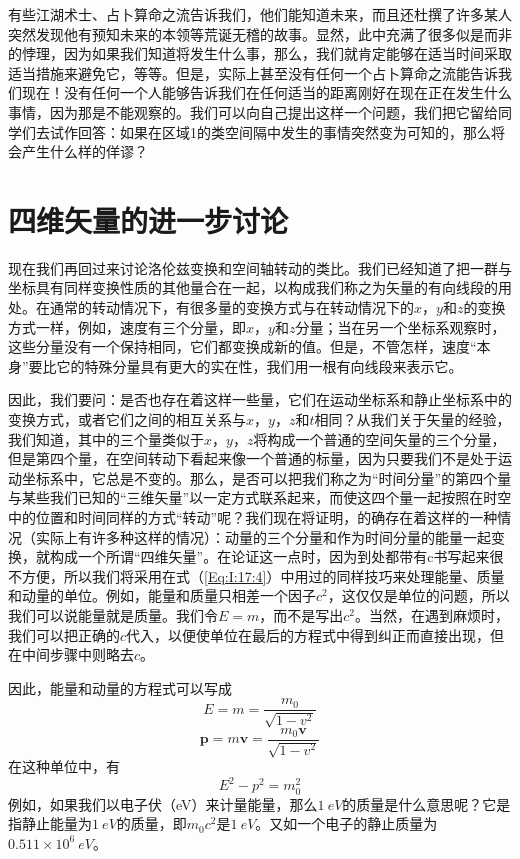 有些江湖术士、占卜算命之流告诉我们，他们能知道未来，而且还杜撰了许多某人突然发现他有预知未来的本领等荒诞无稽的故事。显然，此中充满了很多似是而非的悖理，因为如果我们知道将发生什么事，那么，我们就肯定能够在适当时间采取适当措施来避免它，等等。但是，实际上甚至没有任何一个占卜算命之流能告诉我们现在！没有任何一个人能够告诉我们在任何适当的距离刚好在现在正在发生什么事情，因为那是不能观察的。我们可以向自己提出这样一个问题，我们把它留给同学们去试作回答：如果在区域1的类空间隔中发生的事情突然变为可知的，那么将会产生什么样的佯谬？

\section{四维矢量的进一步讨论}

现在我们再回过来讨论洛伦兹变换和空间轴转动的类比。我们已经知道了把一群与坐标具有同样变换性质的其他量合在一起，以构成我们称之为矢量的有向线段的用处。在通常的转动情况下，有很多量的变换方式与在转动情况下的$x$，$y$和$z$的变换方式一样，例如，速度有三个分量，即$x$，$y$和$z$分量；当在另一个坐标系观察时，这些分量没有一个保持相同，它们都变换成新的值。但是，不管怎样，速度“本身”要比它的特殊分量具有更大的实在性，我们用一根有向线段来表示它。

因此，我们要问：是否也存在着这样一些量，它们在运动坐标系和静止坐标系中的变换方式，或者它们之间的相互关系与$x$，$y$，$z$和$t$相同？从我们关于矢量的经验，我们知道，其中的三个量类似于$x$，$y$，$z$将构成一个普通的空间矢量的三个分量，但是第四个量，在空间转动下看起来像一个普通的标量，因为只要我们不是处于运动坐标系中，它总是不变的。那么，是否可以把我们称之为“时间分量”的第四个量与某些我们已知的“三维矢量”以一定方式联系起来，而使这四个量一起按照在时空中的位置和时间同样的方式“转动”呢？我们现在将证明，的确存在着这样的一种情况（实际上有许多种这样的情况）：动量的三个分量和作为时间分量的能量一起变换，就构成一个所谓“四维矢量”。在论证这一点时，因为到处都带有c书写起来很不方便，所以我们将采用在式（\ref{Eq:I:17:4}）中用过的同样技巧来处理能量、质量和动量的单位。例如，能量和质量只相差一个因子$c^2$，这仅仅是单位的问题，所以我们可以说能量就是质量。我们令$E=m$，而不是写出$c^2$。当然，在遇到麻烦时，我们可以把正确的$c$代入，以便使单位在最后的方程式中得到纠正而直接出现，但在中间步骤中则略去$c$。

因此，能量和动量的方程式可以写成
\begin{equation*}
    E=m=\frac{m_0}{\sqrt{1-v^2}}
\end{equation*}
\begin{equation}
    \label{Eq:I:17:6}
    \boldsymbol{p}=m\boldsymbol{v}=\frac{m_0\boldsymbol{v}}{\sqrt{1-v^2}}
\end{equation}
在这种单位中，有
\begin{equation}
    \label{Eq:I:17:7}
    E^2-p^2=m_0^2
\end{equation}
例如，如果我们以电子伏（eV）来计量能量，那么$1~eV$的质量是什么意思呢？它是指静止能量为$1~eV$的质量，即$m_0c^2$是$1~eV$。又如一个电子的静止质量为$0.511 \times 10^6~eV$。

